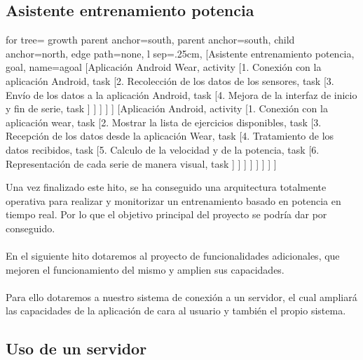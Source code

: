 \subsection{Asistente entrenamiento potencia}
\begin{adjustbox}{margin=3.5ex 16ex 3.5ex 3.5ex,center}
	\begin{forest} for tree={
	    growth parent anchor=south,
	    parent anchor=south,
	    child anchor=north,
	    edge path={none},
	    l sep=.25cm,
	}
	[Asistente entrenamiento potencia, goal, name=agoal
	    [Aplicación Android Wear, activity
	        [1. Conexión con la aplicación Android, task
	       	[2. Recolección de los datos de los sensores, task
	        [3. Envío de los datos a la aplicación Android, task
	        [4. Mejora de la interfaz de inicio y fin de serie, task
	        ] ] ] ] ]
	    [Aplicación Android, activity
	        [1. Conexión con la aplicación wear, task
			[2. Mostrar la lista de ejercicios disponibles, task
	        [3. Recepción de los datos desde la aplicación Wear, task
	        [4. Tratamiento de los datos recibidos, task
	        [5. Calculo de la velocidad y de la potencia, task
	        [6. Representación de cada serie de manera visual, task
	        ] ] ] ] ] ] ] ]
	\end{forest}
\end{adjustbox}
\noindent
Una vez finalizado este hito, se ha conseguido una arquitectura totalmente operativa para realizar y monitorizar un entrenamiento basado en potencia en tiempo real. Por lo que el objetivo principal del proyecto se podría dar por conseguido.
\\
\\
En el siguiente hito dotaremos al proyecto de funcionalidades adicionales, que mejoren el funcionamiento del mismo y amplien sus capacidades.
\\
\\
Para ello dotaremos a nuestro sistema de conexión a un servidor, el cual ampliará las capacidades de la aplicación de cara al usuario y también el propio sistema.
\\
\subsection{Uso de un servidor}

